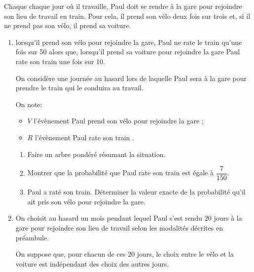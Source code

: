 \medskip

Chaque chaque jour où il travaille, Paul doit se rendre à la gare pour rejoindre son lieu de travail en train. Pour cela, il prend son vélo deux fois sur trois et, si il ne prend pas son vélo, il prend sa voiture.

\medskip

\begin{enumerate}
\item lorsqu'il prend son vélo pour rejoindre la gare, Paul ne rate le train qu'une fois sur 50 alors que, lorsqu'il prend sa voiture pour rejoindre la gare Paul rate son train une fois sur 10.

On considère une journée au hasard lors de laquelle Paul sera à la gare pour prendre le train qui le conduira au travail.

On note:

\setlength\parindent{8mm}
\begin{itemize}
\item[$\bullet~~$] $V$ l'évènement \og Paul prend son vélo pour rejoindre la gare \fg{} ; 
\item[$\bullet~~$] $R$ l'évènement \og Paul rate son train \fg.
\end{itemize}
\setlength\parindent{0mm}

	\begin{enumerate}
		\item Faire un arbre pondéré résumant la situation.
		\item Montrer que la probabilité que Paul rate son train est égale à $\dfrac{7}{150}$.
		\item Paul a raté son train. Déterminer la valeur exacte de la probabilité qu'il ait pris son vélo pour rejoindre la gare.
	\end{enumerate}
\item On choisit au hasard un mois pendant lequel Paul s'est rendu $20$ jours à la gare pour rejoindre son lieu de travail selon les modalités décrites en préambule. 

On suppose que, pour chacun de ces 20 jours, le choix entre le vélo et
la voiture est indépendant des choix des autres jours.


\end{enumerate}
